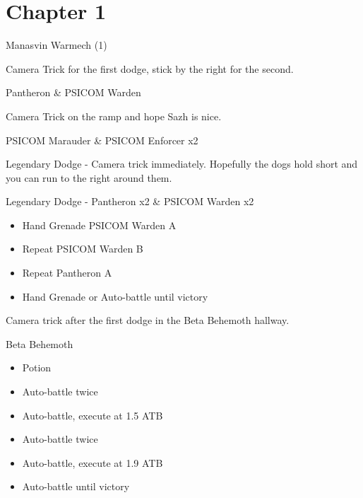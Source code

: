 \chapter{Chapter 1}

	\begin{battle}[1:06]{Manasvin Warmech (1)}
	\end{battle}

	Camera Trick for the first dodge, stick by the right for the second.

	\begin{battle}[0:16]{Pantheron \& PSICOM Warden}
	\end{battle}

	Camera Trick on the ramp and hope Sazh is nice.

	\begin{battle}[0:39]{PSICOM Marauder \& PSICOM Enforcer x2}
	\end{battle}

	Legendary Dodge - Camera trick immediately. Hopefully the dogs hold short and you can run to the right around them.

	\begin{battle}[0:18]{Legendary Dodge - Pantheron x2 \& PSICOM Warden x2}
		\begin{itemize}
			\item Hand Grenade PSICOM Warden A
			\item Repeat PSICOM Warden B
			\item Repeat Pantheron A
			\item Hand Grenade or Auto-battle until victory
		\end{itemize}

	\end{battle}

	Camera trick after the first dodge in the Beta Behemoth hallway.

	\begin{battle}[0:51]{Beta Behemoth}
		\begin{itemize}
			\item Potion
			\item Auto-battle twice
			\item Auto-battle, execute at 1.5 ATB
			\item Auto-battle twice
			\item Auto-battle, execute at 1.9 ATB
			\item Auto-battle until victory
		\end{itemize}
	\end{battle}

